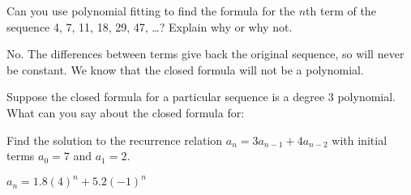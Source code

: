 \begin{squestions}
\begin{answer}
  \end{answer}



\question Can you use polynomial fitting to find the formula for the $n$th term of the sequence 4, 7, 11, 18, 29, 47, \ldots?  Explain why or why not. 

  \begin{answer}
   No.  The differences between terms give back the original sequence, so will never be constant.  We know that the closed formula will not be a polynomial.
  \end{answer}


\question Suppose the closed formula for a particular sequence is a degree 3 polynomial.  What can you say about the closed formula for:

  \begin{answer}
  \end{answer}



\question Find the solution to the recurrence relation $a_n = 3a_{n-1} + 4a_{n-2}$ with initial terms $a_0 = 7$ and $a_1 = 2$.

  \begin{answer}
   $a_n = 1.8(4)^n + 5.2(-1)^n$
  \end{answer}




\end{squestions}
